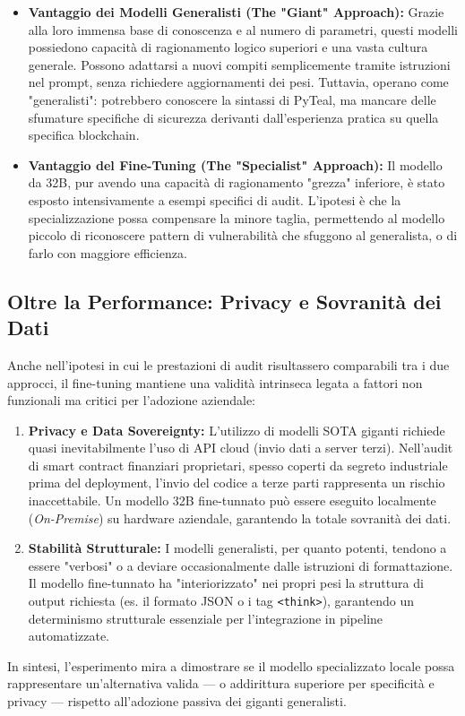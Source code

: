 \begin{itemize}
    \item \textbf{Vantaggio dei Modelli Generalisti (The "Giant" Approach):}
    Grazie alla loro immensa base di conoscenza e al numero di parametri, questi modelli possiedono capacità di ragionamento logico superiori e una vasta cultura generale. Possono adattarsi a nuovi compiti semplicemente tramite istruzioni nel prompt, senza richiedere aggiornamenti dei pesi. Tuttavia, operano come "generalisti": potrebbero conoscere la sintassi di PyTeal, ma mancare delle sfumature specifiche di sicurezza derivanti dall'esperienza pratica su quella specifica blockchain.
    
    \item \textbf{Vantaggio del Fine-Tuning (The "Specialist" Approach):}
    Il modello da 32B, pur avendo una capacità di ragionamento "grezza" inferiore, è stato esposto intensivamente a esempi specifici di audit. L'ipotesi è che la specializzazione possa compensare la minore taglia, permettendo al modello piccolo di riconoscere pattern di vulnerabilità che sfuggono al generalista, o di farlo con maggiore efficienza.
\end{itemize}

\subsection{Oltre la Performance: Privacy e Sovranità dei Dati}
Anche nell'ipotesi in cui le prestazioni di audit risultassero comparabili tra i due approcci, il fine-tuning mantiene una validità intrinseca legata a fattori non funzionali ma critici per l'adozione aziendale:

\begin{enumerate}
    \item \textbf{Privacy e Data Sovereignty:} L'utilizzo di modelli SOTA giganti richiede quasi inevitabilmente l'uso di API cloud (invio dati a server terzi). Nell'audit di smart contract finanziari proprietari, spesso coperti da segreto industriale prima del deployment, l'invio del codice a terze parti rappresenta un rischio inaccettabile. Un modello 32B fine-tunnato può essere eseguito localmente (\textit{On-Premise}) su hardware aziendale, garantendo la totale sovranità dei dati.
    \item \textbf{Stabilità Strutturale:} I modelli generalisti, per quanto potenti, tendono a essere "verbosi" o a deviare occasionalmente dalle istruzioni di formattazione. Il modello fine-tunnato ha "interiorizzato" nei propri pesi la struttura di output richiesta (es. il formato JSON o i tag \texttt{<think>}), garantendo un determinismo strutturale essenziale per l'integrazione in pipeline automatizzate.
\end{enumerate}

In sintesi, l'esperimento mira a dimostrare se il modello specializzato locale possa rappresentare un'alternativa valida — o addirittura superiore per specificità e privacy — rispetto all'adozione passiva dei giganti generalisti.
